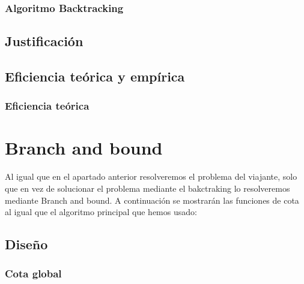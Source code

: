 \documentclass[11pt,openany]{book}
\begin{document}
\subsection{Algoritmo Backtracking}
\section{Justificación}
\section{Eficiencia teórica y empírica}
\subsection{Eficiencia teórica}




\chapter{Branch and bound}
Al igual que en el apartado anterior resolveremos el problema del viajante, solo que en vez de solucionar el problema mediante el bakctraking 
lo resolveremos mediante Branch and bound. A continuación se mostrarán las funciones de cota al igual que el algoritmo principal que hemos usado:

\section{Diseño}
\subsection{Cota global}
\end{document}
